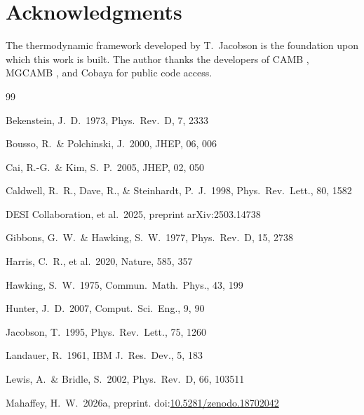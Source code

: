 \documentclass[12pt,a4paper]{article}
\begin{document}
\section*{Acknowledgments}

The thermodynamic framework developed by T.\ Jacobson
\citep{jacobson1995} is the foundation upon which this work is built.
The author thanks the developers of CAMB \citep{lewis2002}, MGCAMB
\citep{wang2023}, and Cobaya \citep{torrado2021} for public code access.


\begin{thebibliography}{99}

Bekenstein, J.\ D.\ 1973, Phys.\ Rev.\ D, 7, 2333

Bousso, R.\ \& Polchinski, J.\ 2000, JHEP, 06, 006

Cai, R.-G.\ \& Kim, S.\ P.\ 2005, JHEP, 02, 050

Caldwell, R.\ R., Dave, R., \& Steinhardt, P.\ J.\ 1998,
Phys.\ Rev.\ Lett., 80, 1582

DESI Collaboration, et al.\ 2025, preprint arXiv:2503.14738

Gibbons, G.\ W.\ \& Hawking, S.\ W.\ 1977, Phys.\ Rev.\ D, 15, 2738

Harris, C.\ R., et al.\ 2020, Nature, 585, 357

Hawking, S.\ W.\ 1975, Commun.\ Math.\ Phys., 43, 199

Hunter, J.\ D.\ 2007, Comput.\ Sci.\ Eng., 9, 90

Jacobson, T.\ 1995, Phys.\ Rev.\ Lett., 75, 1260

Landauer, R.\ 1961, IBM J.\ Res.\ Dev., 5, 183

Lewis, A.\ \& Bridle, S.\ 2002, Phys.\ Rev.\ D, 66, 103511

Mahaffey, H.\ W.\ 2026a, preprint.
doi:\href{https://doi.org/10.5281/zenodo.18702042}{10.5281/zenodo.18702042}


\end{thebibliography}
\end{document}
